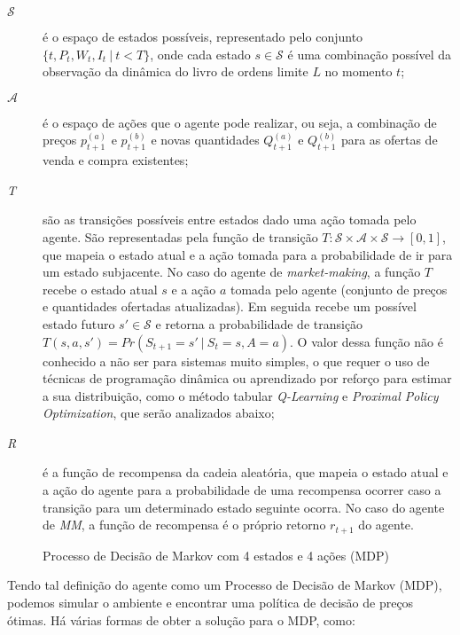 \begin{description}
	\item[$\mathcal{S}$] 
	é o espaço de estados possíveis, representado pelo conjunto $\{t, P_{t}, W_{t}, I_{t} \ | \ t < T\}$, onde cada estado $s \in \mathcal{S}$ é uma combinação possível da observação da dinâmica do livro de ordens limite $L$ no momento $t$;
	
	\item[$\mathcal{A}$] é o espaço de ações que o agente pode realizar, ou seja, a combinação de preços $p^{(a)}_{t + 1}$ e $p^{(b)}_{t + 1}$ e novas quantidades $Q^{(a)}_{t+1}$ e $Q^{(b)}_{t+1}$ para as ofertas de venda e compra existentes;
	
	\item[\textit{T}] são as transições possíveis entre estados dado uma ação tomada pelo agente. São representadas pela função de transição $T :  \mathcal{S} \times \mathcal{A} \times \mathcal{S} \rightarrow [0, 1]$, que mapeia o estado atual e a ação tomada para a probabilidade de ir para um estado subjacente. No caso do agente de \textit{market-making}, a função $T$ recebe o estado atual $s$ e a ação $a$ tomada pelo agente (conjunto de preços e quantidades ofertadas atualizadas). Em seguida recebe um possível estado futuro $s' \in \mathcal{S}$ e retorna a probabilidade de transição $T(s, a, s') = Pr(S_{t+1} = s' \ | \ S_{t} = s, A = a)$. O valor dessa função não é conhecido a não ser para sistemas muito simples, o que requer o uso de técnicas de programação dinâmica ou aprendizado por reforço para estimar a sua distribuição, como o método tabular \textit{Q-Learning} e \textit{Proximal Policy Optimization}, que serão analizados abaixo;

	\item[\textit{R}] é a função de recompensa da cadeia aleatória, que mapeia o estado atual e a ação do agente para a probabilidade de uma recompensa ocorrer caso a transição para um determinado estado seguinte ocorra. No caso do agente de \textit{MM}, a função de recompensa é o próprio retorno $r_{t+1}$ do agente.
\end{description}

\begin{figure}[H]
	\centering
	
	\caption{Processo de Decisão de Markov com 4 estados e 4 ações (MDP)}
	\label{fig:mdp}
\end{figure}

Tendo tal definição do agente como um Processo de Decisão de Markov (MDP), podemos simular o ambiente e encontrar uma política de decisão de preços ótimas. Há várias formas de obter a solução para o MDP, como:


